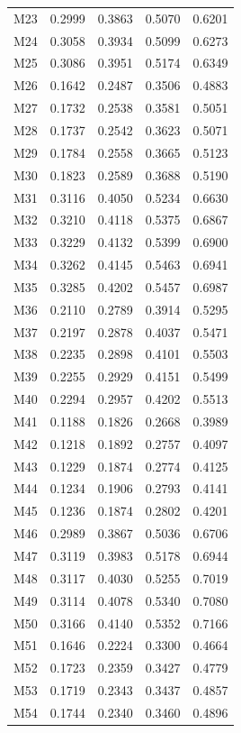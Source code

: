 \begin{longtable}{lrrrr}
M23 & 0.2999 & 0.3863 & 0.5070 & 0.6201 \\
M24 & 0.3058 & 0.3934 & 0.5099 & 0.6273 \\
M25 & 0.3086 & 0.3951 & 0.5174 & 0.6349 \\
M26 & 0.1642 & 0.2487 & 0.3506 & 0.4883 \\
M27 & 0.1732 & 0.2538 & 0.3581 & 0.5051 \\
M28 & 0.1737 & 0.2542 & 0.3623 & 0.5071 \\
M29 & 0.1784 & 0.2558 & 0.3665 & 0.5123 \\
M30 & 0.1823 & 0.2589 & 0.3688 & 0.5190 \\
M31 & 0.3116 & 0.4050 & 0.5234 & 0.6630 \\
M32 & 0.3210 & 0.4118 & 0.5375 & 0.6867 \\
M33 & 0.3229 & 0.4132 & 0.5399 & 0.6900 \\
M34 & 0.3262 & 0.4145 & 0.5463 & 0.6941 \\
M35 & 0.3285 & 0.4202 & 0.5457 & 0.6987 \\
M36 & 0.2110 & 0.2789 & 0.3914 & 0.5295 \\
M37 & 0.2197 & 0.2878 & 0.4037 & 0.5471 \\
M38 & 0.2235 & 0.2898 & 0.4101 & 0.5503 \\
M39 & 0.2255 & 0.2929 & 0.4151 & 0.5499 \\
M40 & 0.2294 & 0.2957 & 0.4202 & 0.5513 \\
M41 & 0.1188 & 0.1826 & 0.2668 & 0.3989 \\
M42 & 0.1218 & 0.1892 & 0.2757 & 0.4097 \\
M43 & 0.1229 & 0.1874 & 0.2774 & 0.4125 \\
M44 & 0.1234 & 0.1906 & 0.2793 & 0.4141 \\
M45 & 0.1236 & 0.1874 & 0.2802 & 0.4201 \\
M46 & 0.2989 & 0.3867 & 0.5036 & 0.6706 \\
M47 & 0.3119 & 0.3983 & 0.5178 & 0.6944 \\
M48 & 0.3117 & 0.4030 & 0.5255 & 0.7019 \\
M49 & 0.3114 & 0.4078 & 0.5340 & 0.7080 \\
M50 & 0.3166 & 0.4140 & 0.5352 & 0.7166 \\
M51 & 0.1646 & 0.2224 & 0.3300 & 0.4664 \\
M52 & 0.1723 & 0.2359 & 0.3427 & 0.4779 \\
M53 & 0.1719 & 0.2343 & 0.3437 & 0.4857 \\
M54 & 0.1744 & 0.2340 & 0.3460 & 0.4896 \\

\end{longtable}
